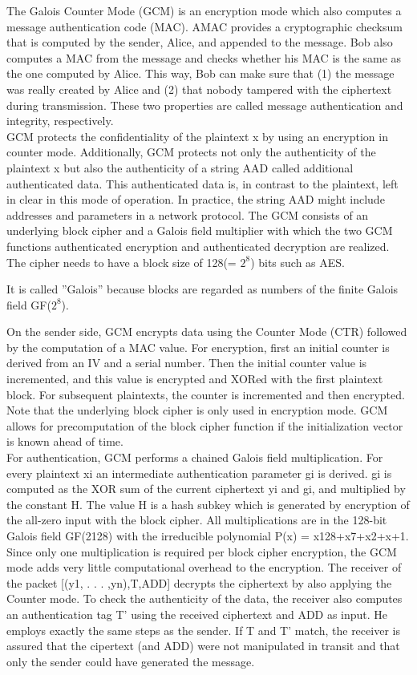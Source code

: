 \documentclass{article}
\begin{document}
The Galois Counter Mode (GCM) is an encryption mode which also computes a
message authentication code (MAC). AMAC provides a cryptographic checksum
that is computed by the sender, Alice, and appended to the message. Bob also
computes a MAC from the message and checks whether his MAC is the same as
the one computed by Alice. This way, Bob can make sure that (1) the message was
really created by Alice and (2) that nobody tampered with the ciphertext during
transmission. These two properties are called message authentication and integrity,
respectively.\\
GCM protects the confidentiality of the plaintext x by using an encryption in
counter mode. Additionally, GCM protects not only the authenticity of the plaintext
x but also the authenticity of a string AAD called additional authenticated data.
This authenticated data is, in contrast to the plaintext, left in clear in this mode of
operation. In practice, the string AAD might include addresses and parameters in a
network protocol.
The GCM consists of an underlying block cipher and a Galois field multiplier
with which the two GCM functions authenticated encryption and authenticated decryption
are realized. The cipher needs to have a block size of 128(= ${2^8}$) bits such as AES.

It is called ”Galois” because blocks are regarded as numbers of the finite Galois field GF(${2^8}$).

On the sender side, GCM encrypts data using the Counter Mode (CTR) followed by
the computation of a MAC value. For encryption, first an initial counter is derived
from an IV and a serial number. Then the initial counter value is incremented, and
this value is encrypted and XORed with the first plaintext block. For subsequent
plaintexts, the counter is incremented and then encrypted. Note that the underlying
block cipher is only used in encryption mode. GCM allows for precomputation of
the block cipher function if the initialization vector is known ahead of time.\\

For authentication, GCM performs a chained Galois field multiplication. For every
plaintext xi an intermediate authentication parameter gi is derived. gi is computed
as the XOR sum of the current ciphertext yi and gi, and multiplied by the
constant H. The value H is a hash subkey which is generated by encryption of the
all-zero input with the block cipher. All multiplications are in the 128-bit Galois
field GF(2128) with the irreducible polynomial P(x) = x128+x7+x2+x+1. Since
only one multiplication is required per block cipher encryption, the GCM mode adds
very little computational overhead to the encryption.
The receiver of the packet [(y1, . . . ,yn),T,ADD] decrypts the ciphertext by also
applying the Counter mode. To check the authenticity of the data, the receiver also
computes an authentication tag T' using the received ciphertext and ADD as input.
He employs exactly the same steps as the sender. If T and T' match, the receiver is assured that the cipertext (and ADD) were not manipulated in transit and that only the sender could have generated the message. 
\end{document}
